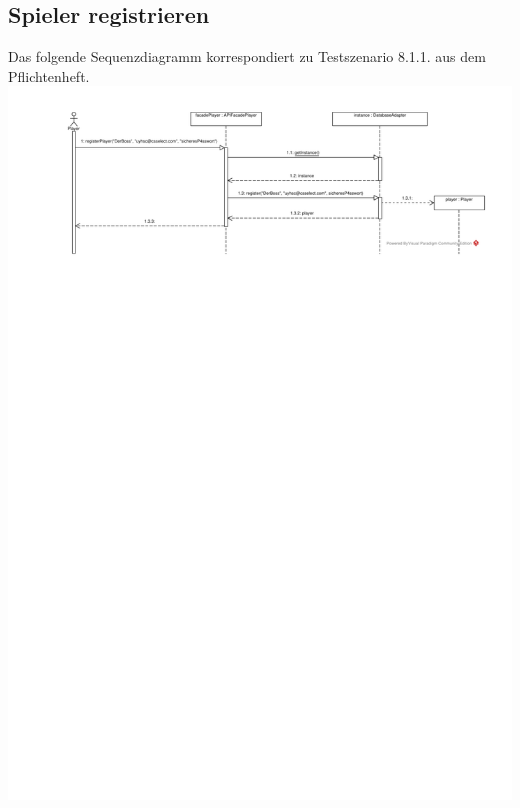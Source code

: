 \documentclass[a4paper]{scrreprt}
\begin{document}
	\subsection{Spieler registrieren}
	Das folgende Sequenzdiagramm korrespondiert zu Testszenario 8.1.1. aus dem Pflichtenheft. \\
	\includegraphics[width=\textwidth]{img/Spieler_registrieren.pdf}
\end{document}
